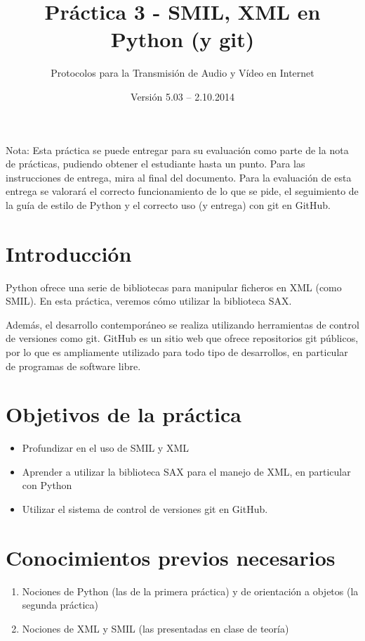 \documentclass[11pt,a4paper]{article}
\begin{document}
\title{Práctica 3 - SMIL, XML en Python (y git)}
\author{Protocolos para la Transmisión de Audio y Vídeo en Internet}
\date{Versión 5.03 – 2.10.2014}


\maketitle


Nota: Esta práctica se puede entregar para su evaluación como parte de la nota de prácticas, pudiendo obtener el estudiante hasta un punto. Para las instrucciones de entrega, mira al final del documento. Para la evaluación de esta entrega se valorará el correcto funcionamiento de lo que se pide, el seguimiento de la guía de estilo de Python y el correcto uso (y entrega) con git en GitHub.

\section{Introducción}

Python ofrece una serie de bibliotecas para manipular ficheros en XML (como SMIL). En esta práctica, veremos cómo utilizar la biblioteca SAX.

Además, el desarrollo contemporáneo se realiza utilizando herramientas de control de versiones como git. GitHub es un sitio web que ofrece repositorios git públicos, por lo que es ampliamente utilizado para todo tipo de desarrollos, en particular de programas de software libre.

\section{Objetivos de la práctica}

\begin{itemize}
  \item Profundizar en el uso de SMIL y XML
  \item Aprender a utilizar la biblioteca SAX para el manejo de XML, en particular con Python
  \item Utilizar el sistema de control de versiones git en GitHub.
\end{itemize}

\section{Conocimientos previos necesarios}

\begin{enumerate}
  \item Nociones de Python (las de la primera práctica) y de orientación a objetos (la segunda práctica)
  \item Nociones de XML y SMIL (las presentadas en clase de teoría)
\end{enumerate}
\end{document}
